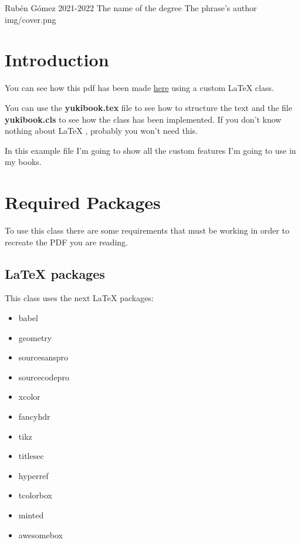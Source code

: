 \documentclass{yukibook}
\begin{document}
  {Rubén Gómez}  %
  {2021-2022}    %
  {The name \linebreak of the degree} %
  {}	%
  {The phrase's author}	%
  {img/cover.png}



\chapter{Introduction}
You can see how this pdf has been made \href{https://github.com/yuki/yukibook.cls}{here} using a custom \LaTeX{}  class.

You can use the \textbf{yukibook.tex} file to see how to structure the text and the file \textbf{yukibook.cls} to see how the class has been implemented. If you don't know nothing about \LaTeX{} , probably you won't need this.

In this example file I'm going to show all the custom features I'm going to use in my books.

\chapter{Required Packages}
To use this class there are some requirements that must be working in order to recreate the PDF you are reading.
\section{\LaTeX{} packages}

This class uses the next \LaTeX{} packages:
\begin{itemize}
  \item babel
  \item geometry
  \item sourcesanspro
  \item sourcecodepro
  \item xcolor
  \item fancyhdr
  \item tikz
  \item titlesec
  \item hyperref
  \item tcolorbox
  \item minted
  \item awesomebox
\end{itemize}
\end{document}
